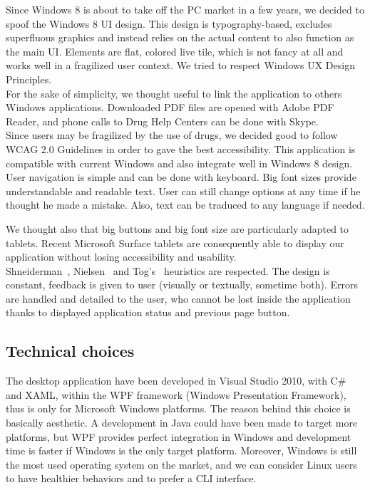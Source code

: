 \documentclass[a4paper,12pt, twocolumn]{article}
\begin{document}
Since Windows 8 is about to take off the PC market in a few years, we decided to spoof the Windows 8 UI design. This design is typography-based, excludes superfluous graphics and instead relies on the actual content to also function as the main UI. Elements are flat, colored live tile, which is not fancy at all and works well in a fragilized user context. We tried to respect Windows UX Design Principles.\\

For the sake of simplicity, we thought useful to link the application to others Windows applications. Downloaded PDF files are opened with Adobe PDF Reader, and phone calls to Drug Help Centers can be done with Skype.\\

Since users may be fragilized by the use of drugs, we decided good to follow WCAG 2.0 Guidelines in order to gave the best accessibility. This application is compatible with current Windows and also integrate well in Windows 8 design. User navigation is simple and can be done with keyboard. Big font sizes provide understandable and readable text. User can still change options at any time if he thought he made a mistake. Also, text can be traduced to any language if needed.

We thought also that big buttons and big font size are particularly adapted to tablets. Recent Microsoft Surface tablets are consequently able to display our application without losing accessibility and usability.\\

Shneiderman~\cite{shneiderman05}, Nielsen~\cite{nielsen94} and Tog's~\cite{tognazzini03} heuristics are respected. The design is constant, feedback is given to user (visually or textually, sometime both). Errors are handled and detailed to the user, who cannot be lost inside the application thanks to displayed application status and previous page button.

\subsection*{Technical choices}

The desktop application have been developed in Visual Studio 2010, with C\# and XAML, within the WPF framework (Windows Presentation Framework), thus is only for Microsoft Windows platforms. The reason behind this choice is basically aesthetic. A development in Java could have been made to target more platforms, but WPF provides perfect integration in Windows and development time is faster if Windows is the only target platform. Moreover, Windows is still the most used operating system on the market, and we can consider Linux users to have healthier behaviors and to prefer a CLI interface.\\
\end{document}
